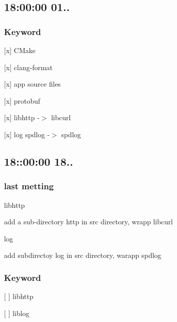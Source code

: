 \subsection*{18\+:00\+:00 01..}

\subsubsection*{Keyword}


\begin{DoxyItemize}
\item \mbox{[}x\mbox{]} C\+Make
\item \mbox{[}x\mbox{]} clang-\/format
\item \mbox{[}x\mbox{]} app source files
\item \mbox{[}x\mbox{]} protobuf
\item \mbox{[}x\mbox{]} libhttp -\/$>$ libcurl
\item \mbox{[}x\mbox{]} log spdlog -\/$>$ spdlog \subsection*{18\+:\+:00\+:00 18..}
\end{DoxyItemize}

\subsubsection*{last metting}


\begin{DoxyItemize}
\item libhttp

add a sub-\/directory {\ttfamily http} in {\ttfamily src} directory, wrapp {\ttfamily libcurl}
\item log

add subdirectoy \textquotesingle{}log\textquotesingle{} in {\ttfamily src} directory, warapp {\ttfamily spdlog}
\end{DoxyItemize}

\subsubsection*{Keyword}


\begin{DoxyItemize}
\item \mbox{[} \mbox{]} libhttp
\item \mbox{[} \mbox{]} liblog 
\end{DoxyItemize}